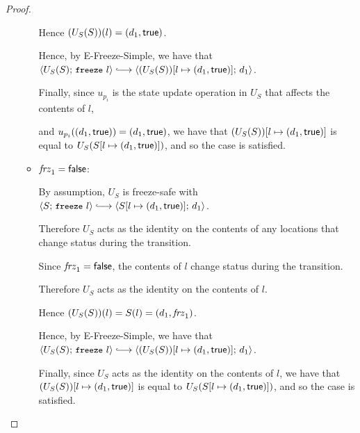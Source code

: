 \begin{proof}
\begin{itemize}
\begin{itemize}
      Hence $(U_S(S))(l) = (d_1, \textsf{true})$.

      Hence, by {\sc E-Freeze-Simple}, we have that
      $\config{U_S(S)}{\freeze{l}} \parstepsto
      \\ \config{\extS{(U_S(S))}{l}{d_1}{\frozentrue}}{d_1}$.

      Finally, since $u_{p_i}$ is the state update operation in $U_S$
      that affects the contents of $l$,

      and $u_{p_i}((d_1, \textsf{true})) =
      (d_1, \textsf{true})$, we have that
      $(U_S(S))[l \mapsto (d_1, \textsf{true})]$ is equal to
      $U_S(S[l \mapsto (d_1, \textsf{true})])$, and so the case is
      satisfied.

    \item $\mathit{frz}_1 = \textsf{false}$:

      By assumption, $U_S$ is freeze-safe with $\config{S}{\freeze{l}}
      \parstepsto \config{\extS{S}{l}{d_1}{\frozentrue}}{d_1}$.

      Therefore $U_S$ acts as the identity on the contents of any
      locations that change status during the transition.

      Since $\mathit{frz}_1 = \textsf{false}$, the contents of $l$ change
      status during the transition.

      Therefore $U_S$ acts as the identity on the contents of $l$.

      Hence $(U_S(S))(l) = S(l) = (d_1, \mathit{frz}_1)$.

      Hence, by {\sc E-Freeze-Simple}, we have that
      $\config{U_S(S)}{\freeze{l}} \parstepsto
      \\ \config{\extS{(U_S(S))}{l}{d_1}{\frozentrue}}{d_1}$.

      Finally, since $U_S$ acts as the identity on the contents of
      $l$, we have that $(U_S(S))[l \mapsto (d_1, \textsf{true})]$ is
      equal to $U_S(S[l \mapsto (d_1, \textsf{true})])$, and so the case
      is satisfied.
    \end{itemize}

  \end{itemize}
\end{proof}
